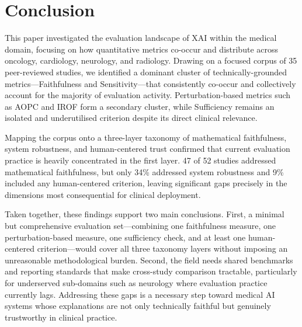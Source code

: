 \section{Conclusion}

This paper investigated the evaluation landscape of XAI within the medical
domain, focusing on how quantitative metrics co-occur and distribute
across oncology, cardiology, neurology, and radiology. Drawing on a
focused corpus of 35 peer-reviewed studies, we identified a dominant cluster of
technically-grounded metrics---Faithfulness and Sensitivity---that
consistently co-occur and collectively account for the majority of evaluation
activity. Perturbation-based metrics such as AOPC and IROF form a secondary
cluster, while Sufficiency remains an isolated and underutilised criterion
despite its direct clinical relevance.

Mapping the corpus onto a three-layer taxonomy of mathematical faithfulness,
system robustness, and human-centered trust confirmed that current evaluation
practice is heavily concentrated in the first layer. 47 of 52 studies addressed
mathematical faithfulness, but only 34\% addressed system robustness and
9\% included any human-centered criterion,
leaving significant gaps precisely in the dimensions most consequential
for clinical deployment.

Taken together, these findings support two main conclusions. First, a
minimal but comprehensive evaluation set---combining one faithfulness
measure, one perturbation-based measure, one sufficiency check, and at
least one human-centered criterion---would cover all three taxonomy layers
without imposing an unreasonable methodological burden. Second, the field
needs shared benchmarks and reporting standards that make cross-study
comparison tractable, particularly for underserved sub-domains such as
neurology where evaluation practice currently lags. Addressing these gaps
is a necessary step toward medical AI systems whose explanations are not
only technically faithful but genuinely trustworthy in clinical practice.

\newpage
